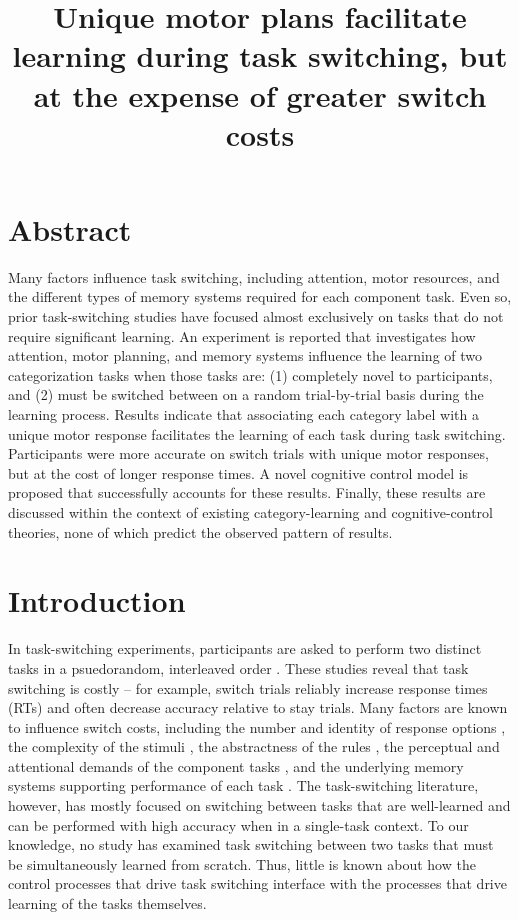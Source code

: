 \documentclass[doc, floatsintext]{apa7}
\title{Unique motor plans facilitate learning during task
switching, but at the expense of greater switch costs}
\begin{document}
\maketitle
\newpage

\section{Abstract}
Many factors influence task switching, including attention,
motor resources, and the different types of memory systems
required for each component task. Even so, prior
task-switching studies have focused almost exclusively on
tasks that do not require significant learning. An
experiment is reported that investigates how attention,
motor planning, and memory systems influence the learning of
two categorization tasks when those tasks are: (1)
completely novel to participants, and (2) must be switched
between on a random trial-by-trial basis during the learning
process.  Results indicate that associating each category
label with a unique motor response facilitates the learning
of each task during task switching. Participants were more
accurate on switch trials with unique motor responses, but
at the cost of longer response times. A novel cognitive
control model is proposed that successfully accounts for
these results.  Finally, these results are discussed within
the context of existing category-learning and
cognitive-control theories, none of which predict the
observed pattern of results.

\section{Introduction}
In task-switching experiments, participants are asked to
perform two distinct tasks in a psuedorandom, interleaved
order \parencite{kiesel_control_2010, monsell_task_2003}.
These studies reveal that task switching is costly -- for
example, switch trials reliably increase response times
(RTs) and often decrease accuracy relative to stay trials.
Many factors are known to influence switch costs, including
the number and identity of response options
\parencite{philipp_integration_2010, philipp_role_2011,
philipp_differential_2013}, the complexity of the stimuli
\parencite{witt_fmri_2013}, the abstractness of the rules
\parencite{stelzel_functional_2011}, the perceptual and
attentional demands of the component tasks
\parencite{arrington_tasks_2003,
chiu_domain-independent_2009, nagahama_dissociable_2001,
ravizza_shifting_2008, rushworth_components_2002}, and the
underlying memory systems supporting performance of each
task \parencite{crossley_trial-by-trial_2018,
turner_hierarchical_2017}. The task-switching literature,
however, has mostly focused on switching between tasks that
are well-learned and can be performed with high accuracy
when in a single-task context.  To our knowledge, no study
has examined task switching between two tasks that must be
simultaneously learned from scratch. Thus, little is known
about how the control processes that drive task switching
interface with the processes that drive learning of the
tasks themselves.
\end{document}
